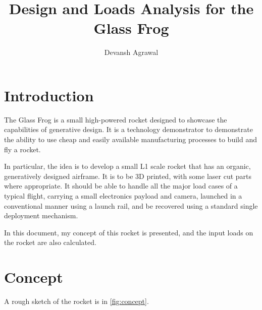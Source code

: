 \documentclass[11pt]{article}
\title{Design and Loads Analysis for  the Glass Frog}
\author{Devansh Agrawal}
\begin{document}
\maketitle


\section{Introduction}

The Glass Frog is a small high-powered rocket designed to showcase the capabilities of generative design. It is a technology demonstrator to demonstrate the ability to use cheap and easily available manufacturing processes to build and fly a rocket. 

In particular, the idea is to develop a small L1 scale rocket that has an organic, generatively designed airframe. It is to be 3D printed, with some laser cut parts where appropriate. It should be able to handle all the major load cases of a typical flight, carrying a small electronics payload and camera, launched in a conventional manner using a launch rail, and be recovered using a standard single deployment mechanism. 

In this document, my concept of this rocket is presented, and the input loads on the rocket are also calculated. 

\section{Concept}

A rough sketch of the rocket is in \autoref{fig:concept}. 
\end{document}
